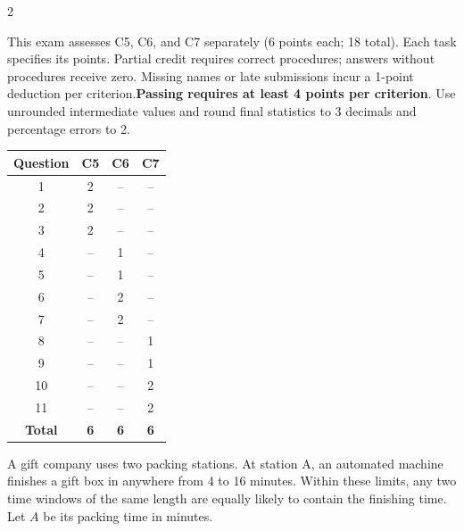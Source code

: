 \begin{multicols}{2}
	\raggedcolumns
	
\vspace{-0.2cm}
This exam assesses C5, C6, and C7 separately (6 points each; 18 total). Each task specifies its points. Partial credit requires correct procedures; answers without procedures receive zero. Missing names or late submissions incur a 1-point deduction per criterion.\textbf{Passing requires at least 4 points per criterion}. Use unrounded intermediate values and round final statistics to 3 decimals and percentage errors to 2.

\vspace{-9mm}
\begin{center}
	\begin{tabular}{|c|c|c|c|}
		\hline
		\textbf{Question} & \textbf{C5} & \textbf{C6} & \textbf{C7} \\ \hline
		1  & 2  & -- & -- \\ \hline
		2  & 2  & -- & -- \\ \hline
		3  & 2  & -- & -- \\ \hline
		4  & -- & 1  & -- \\ \hline
		5  & -- & 1  & -- \\ \hline
		6  & -- & 2  & -- \\ \hline
		7  & -- & 2  & -- \\ \hline
		8  & -- & -- & 1  \\ \hline
		9  & -- & -- & 1  \\ \hline
		10 & -- & -- & 2  \\ \hline
		11 & -- & -- & 2  \\ \hline
		\textbf{Total} & \textbf{6} & \textbf{6} & \textbf{6} \\ \hline
	\end{tabular}
\end{center}


A gift company uses two packing stations. At station A, an automated machine
finishes a gift box in anywhere from 4 to 16 minutes. Within these limits,
any two time windows of the same length are equally likely to contain the
finishing time. Let $A$ be its packing time in minutes.


\end{multicols}
